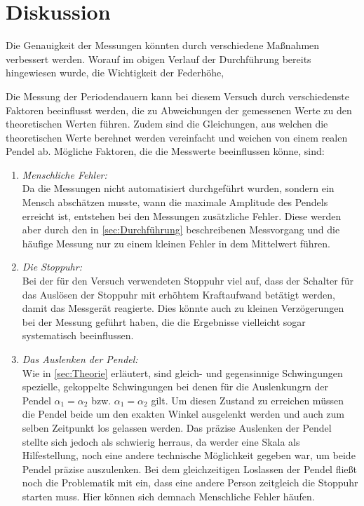 \section{Diskussion}
  Die Genauigkeit der Messungen könnten durch verschiedene Maßnahmen verbessert werden. Worauf im obigen Verlauf der
  Durchführung bereits hingewiesen wurde, die Wichtigkeit der Federhöhe, 
\label{sec:Diskussion}

Die Messung der Periodendauern kann bei diesem Versuch durch verschiedenste Faktoren beeinflusst werden, die zu Abweichungen
der gemessenen Werte zu den theoretischen Werten führen. Zudem sind die Gleichungen, aus welchen die theoretischen Werte 
berehnet werden vereinfacht und weichen von einem realen Pendel ab. 
Mögliche Faktoren, die die Messwerte beeinflussen könne, sind:
\begin{enumerate}
    \item \textit{Menschliche Fehler:}\\
        Da die Messungen nicht automatisiert durchgeführt wurden, sondern ein Mensch abschätzen musste, wann die maximale 
        Amplitude des Pendels erreicht ist, entstehen bei den Messungen zusätzliche Fehler. Diese werden aber durch den in
        \ref{sec:Durchführung} beschreibenen Messvorgang und die häufige Messung nur zu einem kleinen Fehler in dem Mittelwert
        führen.
    \item \textit{Die Stoppuhr:}\\
        Bei der für den Versuch verwendeten Stoppuhr viel auf, dass der Schalter für das Auslösen der Stoppuhr mit erhöhtem 
        Kraftaufwand betätigt werden, damit das Messgerät reagierte. Dies könnte auch zu kleinen Verzögerungen bei der 
        Messung geführt haben, die die Ergebnisse vielleicht sogar systematisch beeinflussen.
    \item \textit{Das Auslenken der Pendel:}\\
        Wie in \ref{sec:Theorie} erläutert, sind gleich- und gegensinnige Schwingungen spezielle, gekoppelte Schwingungen bei 
        denen für die Auslenkungrn der Pendel $\alpha_1=\alpha_2$ bzw. $\alpha_1=\alpha_2$ gilt. Um diesen Zustand zu erreichen
        müssen die Pendel beide um den exakten Winkel ausgelenkt werden und auch zum selben Zeitpunkt los gelassen werden. Das 
        präzise Auslenken der Pendel stellte sich jedoch als schwierig herraus, da werder eine Skala als Hilfestellung, noch 
        eine andere technische Möglichkeit gegeben war, um beide Pendel präzise auszulenken. Bei dem gleichzeitigen Loslassen
        der Pendel fließt noch die Problematik mit ein, dass eine andere Person zeitgleich die Stoppuhr starten muss. Hier 
        können sich demnach Menschliche Fehler häufen.
\end{enumerate}
